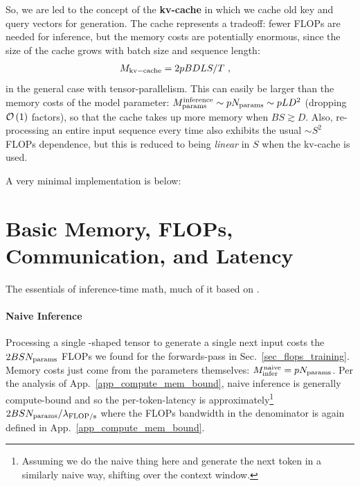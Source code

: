 \documentclass[11pt]{article}
\begin{document}
So, we are led to the concept of the \textbf{kv-cache} in which we cache old key and query vectors for generation.
The cache represents a tradeoff: fewer FLOPs are needed for inference, but the memory costs are potentially
enormous, since the size of the cache grows with batch size and sequence length:
\begin{align}
	M _{ {\rm kv-cache}  } & = 2pBDLS /T\ ,  \label{eq_kv_cache_memory}
\end{align}
in the general case with tensor-parallelism. This can easily be larger than the memory costs of the
model parameter: $ M _{ {\rm params}  } ^{ {\rm  inference}  } \sim p N _{ {\rm params}  } \sim p LD
		^{ 2 }  $ (dropping $ \mathcal{O} \left( 1 \right)  $ factors), so that the cache takes up more memory
when $ BS \gtrsim D $. Also, re-processing an entire input sequence every time also exhibits the
usual $\sim S ^{ 2 }  $ FLOPs dependence, but this is reduced to being \textit{linear} in $ S $
when the kv-cache is used.


A very minimal implementation is below:


\section{Basic Memory, FLOPs, Communication, and Latency}

The essentials of inference-time math, much of it based on \cite{kipply_inference_math}.

\paragraph{Naive Inference} Processing a single -shaped tensor to generate a single
next input costs the $ 2BSN _{ {\rm params}  } $ FLOPs we found for the forwards-pass in
Sec.~\ref{sec_flops_training}. Memory costs just come from the parameters themselves: $ M _{ {\rm
					infer}  }^{ {\rm naive}  }=pN _{ {\rm params}  } $. Per the analysis of App.~\ref{app_compute_mem_bound},
naive inference is generally compute-bound and so the per-token-latency is approximately\footnote{Assuming we
	do the naive thing here and generate the next token in a similarly naive way, shifting over the
	context window.}  $  2BSN _{ {\rm params}  }/ \lambda _{ {\rm FLOP/s}  } $ where the FLOPs bandwidth
in the denominator is again defined in App.~\ref{app_compute_mem_bound}.
\end{document}
